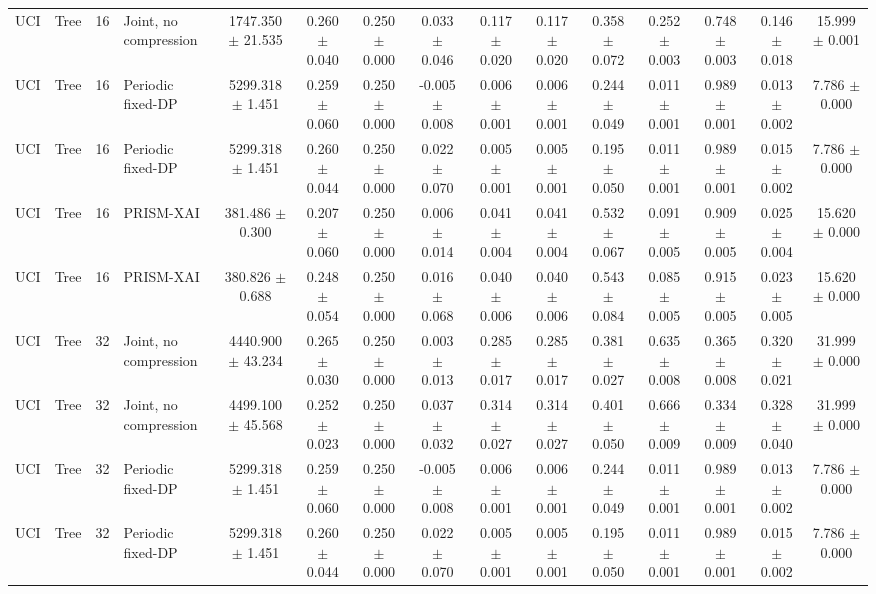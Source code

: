 \begin{table}[t]
\begin{tabular}{llllccccccccccc}
UCI & Tree & 16 & Joint, no compression & 1747.350 $\pm$ 21.535 & 0.260 $\pm$ 0.040 & 0.250 $\pm$ 0.000 & 0.033 $\pm$ 0.046 & 0.117 $\pm$ 0.020 & 0.117 $\pm$ 0.020 & 0.358 $\pm$ 0.072 & 0.252 $\pm$ 0.003 & 0.748 $\pm$ 0.003 & 0.146 $\pm$ 0.018 & 15.999 $\pm$ 0.001 \\
UCI & Tree & 16 & Periodic fixed-DP & 5299.318 $\pm$ 1.451 & 0.259 $\pm$ 0.060 & 0.250 $\pm$ 0.000 & -0.005 $\pm$ 0.008 & 0.006 $\pm$ 0.001 & 0.006 $\pm$ 0.001 & 0.244 $\pm$ 0.049 & 0.011 $\pm$ 0.001 & 0.989 $\pm$ 0.001 & 0.013 $\pm$ 0.002 & 7.786 $\pm$ 0.000 \\
UCI & Tree & 16 & Periodic fixed-DP & 5299.318 $\pm$ 1.451 & 0.260 $\pm$ 0.044 & 0.250 $\pm$ 0.000 & 0.022 $\pm$ 0.070 & 0.005 $\pm$ 0.001 & 0.005 $\pm$ 0.001 & 0.195 $\pm$ 0.050 & 0.011 $\pm$ 0.001 & 0.989 $\pm$ 0.001 & 0.015 $\pm$ 0.002 & 7.786 $\pm$ 0.000 \\
UCI & Tree & 16 & PRISM-XAI & 381.486 $\pm$ 0.300 & 0.207 $\pm$ 0.060 & 0.250 $\pm$ 0.000 & 0.006 $\pm$ 0.014 & 0.041 $\pm$ 0.004 & 0.041 $\pm$ 0.004 & 0.532 $\pm$ 0.067 & 0.091 $\pm$ 0.005 & 0.909 $\pm$ 0.005 & 0.025 $\pm$ 0.004 & 15.620 $\pm$ 0.000 \\
UCI & Tree & 16 & PRISM-XAI & 380.826 $\pm$ 0.688 & 0.248 $\pm$ 0.054 & 0.250 $\pm$ 0.000 & 0.016 $\pm$ 0.068 & 0.040 $\pm$ 0.006 & 0.040 $\pm$ 0.006 & 0.543 $\pm$ 0.084 & 0.085 $\pm$ 0.005 & 0.915 $\pm$ 0.005 & 0.023 $\pm$ 0.005 & 15.620 $\pm$ 0.000 \\
UCI & Tree & 32 & Joint, no compression & 4440.900 $\pm$ 43.234 & 0.265 $\pm$ 0.030 & 0.250 $\pm$ 0.000 & 0.003 $\pm$ 0.013 & 0.285 $\pm$ 0.017 & 0.285 $\pm$ 0.017 & 0.381 $\pm$ 0.027 & 0.635 $\pm$ 0.008 & 0.365 $\pm$ 0.008 & 0.320 $\pm$ 0.021 & 31.999 $\pm$ 0.000 \\
UCI & Tree & 32 & Joint, no compression & 4499.100 $\pm$ 45.568 & 0.252 $\pm$ 0.023 & 0.250 $\pm$ 0.000 & 0.037 $\pm$ 0.032 & 0.314 $\pm$ 0.027 & 0.314 $\pm$ 0.027 & 0.401 $\pm$ 0.050 & 0.666 $\pm$ 0.009 & 0.334 $\pm$ 0.009 & 0.328 $\pm$ 0.040 & 31.999 $\pm$ 0.000 \\
UCI & Tree & 32 & Periodic fixed-DP & 5299.318 $\pm$ 1.451 & 0.259 $\pm$ 0.060 & 0.250 $\pm$ 0.000 & -0.005 $\pm$ 0.008 & 0.006 $\pm$ 0.001 & 0.006 $\pm$ 0.001 & 0.244 $\pm$ 0.049 & 0.011 $\pm$ 0.001 & 0.989 $\pm$ 0.001 & 0.013 $\pm$ 0.002 & 7.786 $\pm$ 0.000 \\
UCI & Tree & 32 & Periodic fixed-DP & 5299.318 $\pm$ 1.451 & 0.260 $\pm$ 0.044 & 0.250 $\pm$ 0.000 & 0.022 $\pm$ 0.070 & 0.005 $\pm$ 0.001 & 0.005 $\pm$ 0.001 & 0.195 $\pm$ 0.050 & 0.011 $\pm$ 0.001 & 0.989 $\pm$ 0.001 & 0.015 $\pm$ 0.002 & 7.786 $\pm$ 0.000 \\

\end{tabular}
\end{table}
